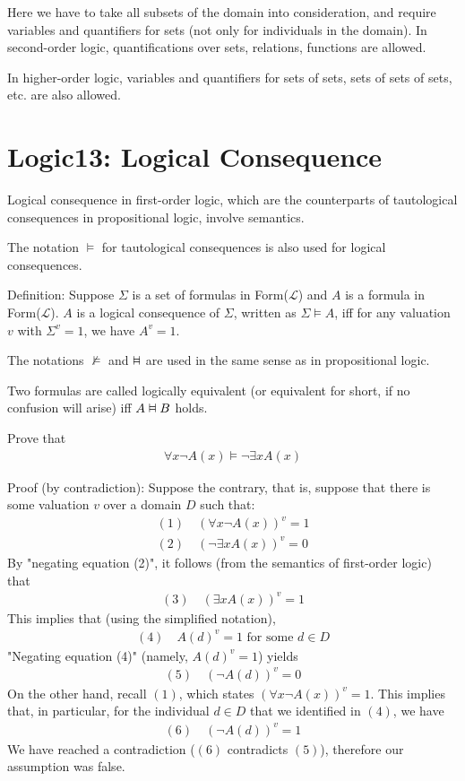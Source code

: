 \documentclass{article}
\newcommand{\vDashv}{%
  \mathrel{%
    \text{%
      \ooalign{$\vDash$\cr\reflectbox{$\vDash$}\cr}%
    }%
  }%
}
\begin{document}
Here we have to take all subsets of the domain into consideration, and require variables and quantifiers for sets (not only for individuals in the domain). In second-order logic, quantifications over sets, relations, functions are allowed.

In higher-order logic, variables and quantifiers for sets of sets, sets of sets of sets, etc. are also allowed.

\section{Logic13: Logical Consequence}

Logical consequence in first-order logic, which are the counterparts of tautological consequences in propositional logic, involve semantics.

The notation $\vDash$ for tautological consequences is also used for logical consequences.

Definition: Suppose $\Sigma$ is a set of formulas in Form($\mathcal{L}$) and $A$ is a formula in Form($\mathcal{L}$). $A$ is a logical consequence of $\Sigma$, written as $\Sigma \vDash A$, iff for any valuation $v$ with $\Sigma^v = 1$, we have $A^v = 1$.

The notations $\not\vDash$ and $\vDashv$ are used in the same sense as in propositional logic.

Two formulas are called logically equivalent (or equivalent for short, if no confusion will arise) iff $A \vDashv B$ holds.

Prove that 
\begin{align*}
\forall x \neg A(x) \vDash \neg \exists x A(x)
\end{align*}

Proof (by contradiction): Suppose the contrary, that is, suppose that there is some valuation $v$ over a domain $D$ such that:
\begin{align*}
(1) \quad (\forall x \neg A(x))^v = 1 \\
(2) \quad (\neg \exists x A(x))^v = 0
\end{align*}
By "negating equation (2)", it follows (from the semantics of first-order logic) that 
\begin{align*}
(3)\quad  (\exists x A(x))^v = 1
\end{align*}
This implies that (using the simplified notation),
\begin{align*}
(4) \quad A(d)^v = 1 \text{ for some } d \in D
\end{align*}
"Negating equation (4)" (namely, $A(d)^v = 1$) yields
\begin{align*}
(5)\quad  (\neg A(d))^v = 0
\end{align*}
On the other hand, recall $(1)$, which states $(\forall x \neg A(x))^v = 1$. This implies that, in particular, for the individual $d \in D$ that we identified in $(4)$, we have
\begin{align*}
(6) \quad (\neg A (d))^v = 1
\end{align*}
We have reached a contradiction ($(6)$ contradicts $(5)$), therefore our assumption was false. 
\end{document}
